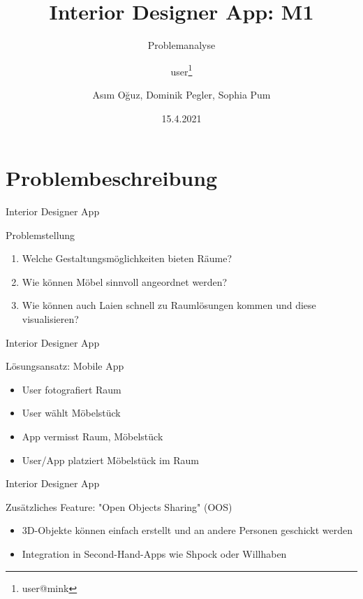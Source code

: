 \documentclass[presentation,bigger,aspectratio=169]{beamer}
\author{user\thanks{user@mink}}
\date{15.4.2021}
\title{Interior Designer App: M1}
\subtitle{Problemanalyse}
\author[A.Oğuz, D.Pegler, S.Pum]{Asım Oğuz, Dominik Pegler, Sophia Pum}
\institute{Universität Wien, Fakultät für Informatik (SS2021)}
\begin{document}
\maketitle

\section{Problembeschreibung}
\label{sec:orgf7cf806}

\begin{frame}[label={sec:org9e1a7f7}]{\vspace{2.2cm}\begin{center}\MakeUppercase{\insertsection}\end{center}}
\end{frame}

\begin{frame}[label={sec:org5a84d17}]{Interior Designer App}
\begin{block}{Problemstellung}
\begin{enumerate}
\item Welche Gestaltungsmöglichkeiten bieten Räume?
\item Wie können Möbel sinnvoll angeordnet werden?
\item Wie können auch Laien schnell zu Raumlösungen kommen und diese
visualisieren?
\end{enumerate}
\end{block}
\end{frame}
\begin{frame}[label={sec:org48c4964}]{Interior Designer App}
\begin{block}{Lösungsansatz: Mobile App}
\begin{itemize}
\item User fotografiert Raum
\item User wählt Möbelstück
\item App vermisst Raum, Möbelstück
\item User/App platziert Möbelstück im Raum
\end{itemize}
\vspace{0.8em}
\end{block}
\end{frame}

\begin{frame}[label={sec:org62f4709}]{Interior Designer App}
\begin{block}{Zusätzliches Feature: "Open Objects Sharing" (OOS)}
\begin{itemize}
\item 3D-Objekte können einfach erstellt und an andere Personen geschickt werden
\item Integration in Second-Hand-Apps wie Shpock oder Willhaben
\end{itemize}
\end{block}
\end{frame}
\end{document}
